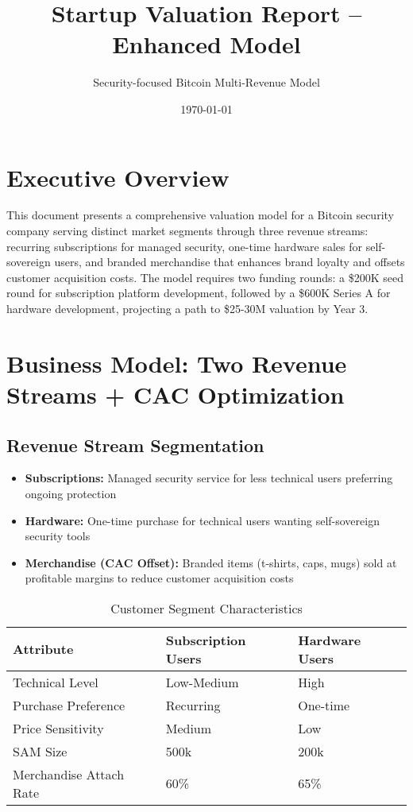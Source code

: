 \documentclass[11pt]{article}
\begin{document}
\title{Startup Valuation Report -- Enhanced Model}
\author{Security-focused Bitcoin Multi-Revenue Model}
\date{\today}
\maketitle

\section*{Executive Overview}
This document presents a comprehensive valuation model for a Bitcoin security company serving distinct market segments through three revenue streams: recurring subscriptions for managed security, one-time hardware sales for self-sovereign users, and branded merchandise that enhances brand loyalty and offsets customer acquisition costs. The model requires two funding rounds: a \$200K seed round for subscription platform development, followed by a \$600K Series A for hardware development, projecting a path to \$25-30M valuation by Year 3.

\section{Business Model: Two Revenue Streams + CAC Optimization}

\subsection{Revenue Stream Segmentation}
\begin{itemize}
  \item \textbf{Subscriptions:} Managed security service for less technical users preferring ongoing protection
  \item \textbf{Hardware:} One-time purchase for technical users wanting self-sovereign security tools
  \item \textbf{Merchandise (CAC Offset):} Branded items (t-shirts, caps, mugs) sold at profitable margins to reduce customer acquisition costs
\end{itemize}

\begin{table}[H]
\centering
\caption{Customer Segment Characteristics}
\begin{tabularx}{\linewidth}{l X X}
\toprule
Attribute & Subscription Users & Hardware Users \\\midrule
Technical Level & Low-Medium & High \\
Purchase Preference & Recurring & One-time \\
Price Sensitivity & Medium & Low \\
SAM Size & 500k & 200k \\
Merchandise Attach Rate & 60\% & 65\% \\
\bottomrule
\end{tabularx}
\end{table}
\end{document}
